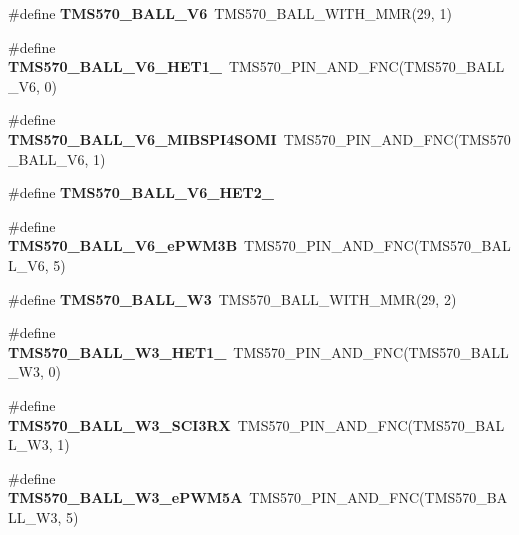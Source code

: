 \begin{DoxyCompactItemize}
\#define {\bfseries T\+M\+S570\+\_\+\+B\+A\+L\+L\+\_\+\+V6}~T\+M\+S570\+\_\+\+B\+A\+L\+L\+\_\+\+W\+I\+T\+H\+\_\+\+M\+MR(29, 1)
\item 
\mbox{\label{tms570lc4357-pins_8h_ae39ff47f1299120fe72bb9c5634907f7}} 
\#define {\bfseries T\+M\+S570\+\_\+\+B\+A\+L\+L\+\_\+\+V6\+\_\+\+H\+E\+T1\+\_}~T\+M\+S570\+\_\+\+P\+I\+N\+\_\+\+A\+N\+D\+\_\+\+F\+NC(T\+M\+S570\+\_\+\+B\+A\+L\+L\+\_\+\+V6, 0)
\item 
\mbox{\label{tms570lc4357-pins_8h_a65d6e293bcd8cd326301e9c4fa8c4d9a}} 
\#define {\bfseries T\+M\+S570\+\_\+\+B\+A\+L\+L\+\_\+\+V6\+\_\+\+M\+I\+B\+S\+P\+I4\+S\+O\+MI}~T\+M\+S570\+\_\+\+P\+I\+N\+\_\+\+A\+N\+D\+\_\+\+F\+NC(T\+M\+S570\+\_\+\+B\+A\+L\+L\+\_\+\+V6, 1)
\item 
\#define {\bfseries T\+M\+S570\+\_\+\+B\+A\+L\+L\+\_\+\+V6\+\_\+\+H\+E\+T2\+\_}
\item 
\mbox{\label{tms570lc4357-pins_8h_af0cf7524f94e66fa85440bec4f4b4afd}} 
\#define {\bfseries T\+M\+S570\+\_\+\+B\+A\+L\+L\+\_\+\+V6\+\_\+e\+P\+W\+M3B}~T\+M\+S570\+\_\+\+P\+I\+N\+\_\+\+A\+N\+D\+\_\+\+F\+NC(T\+M\+S570\+\_\+\+B\+A\+L\+L\+\_\+\+V6, 5)
\item 
\mbox{\label{tms570lc4357-pins_8h_af2acfd91bc4b3c388499a22ca91abc18}} 
\#define {\bfseries T\+M\+S570\+\_\+\+B\+A\+L\+L\+\_\+\+W3}~T\+M\+S570\+\_\+\+B\+A\+L\+L\+\_\+\+W\+I\+T\+H\+\_\+\+M\+MR(29, 2)
\item 
\mbox{\label{tms570lc4357-pins_8h_a9218b1be6ec7d6c8f5b9c576c5be1f23}} 
\#define {\bfseries T\+M\+S570\+\_\+\+B\+A\+L\+L\+\_\+\+W3\+\_\+\+H\+E\+T1\+\_}~T\+M\+S570\+\_\+\+P\+I\+N\+\_\+\+A\+N\+D\+\_\+\+F\+NC(T\+M\+S570\+\_\+\+B\+A\+L\+L\+\_\+\+W3, 0)
\item 
\mbox{\label{tms570lc4357-pins_8h_ae436e585f53cee8d313d975c3e8fc100}} 
\#define {\bfseries T\+M\+S570\+\_\+\+B\+A\+L\+L\+\_\+\+W3\+\_\+\+S\+C\+I3\+RX}~T\+M\+S570\+\_\+\+P\+I\+N\+\_\+\+A\+N\+D\+\_\+\+F\+NC(T\+M\+S570\+\_\+\+B\+A\+L\+L\+\_\+\+W3, 1)
\item 
\mbox{\label{tms570lc4357-pins_8h_a0953d3778e55192b167e585252e1b9dd}} 
\#define {\bfseries T\+M\+S570\+\_\+\+B\+A\+L\+L\+\_\+\+W3\+\_\+e\+P\+W\+M5A}~T\+M\+S570\+\_\+\+P\+I\+N\+\_\+\+A\+N\+D\+\_\+\+F\+NC(T\+M\+S570\+\_\+\+B\+A\+L\+L\+\_\+\+W3, 5)

\end{DoxyCompactItemize}
